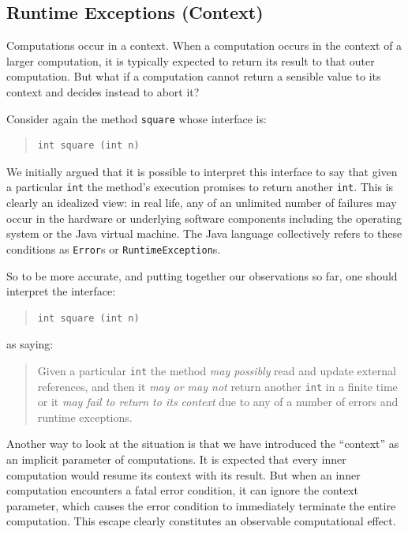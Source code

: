 \documentclass{article}
\theoremstyle{remark}
\begin{document}
\subsection*{Runtime Exceptions (Context)}

Computations occur in a context. When a computation occurs in the context of
a larger computation, it is typically expected to return its result to that
outer computation. But what if a computation cannot return a sensible value
to its context and decides instead to abort it?

Consider again the method \verb|square| whose interface is:
\begin{quote}
\begin{verbatim} 
int square (int n)
\end{verbatim}
\end{quote}
We initially argued that it is possible to interpret this interface to say
that given a particular \verb|int| the method's execution promises to return
another \verb|int|. This is clearly an idealized view: in real life, any of
an unlimited number of failures may occur in the hardware or underlying
software components including the operating system or the Java virtual
machine. The Java language collectively refers to these conditions as
\verb|Error|s or \verb|RuntimeException|s.

So to be more accurate, and putting together our observations so far, one
should interpret the interface:
\begin{quote}
\begin{verbatim} 
int square (int n)
\end{verbatim}
\end{quote}
as saying:
\begin{quote}
Given a particular \verb|int| the method \emph{may possibly} read and
update external references, and then it \emph{may or may not} return another
\verb|int| in a finite time or it \emph{may fail to return to its context}
due to any of a number of errors and runtime exceptions.
\end{quote}

Another way to look at the situation is that we have introduced the
``context'' as an implicit parameter of computations. It is expected that
every inner computation would resume its context with its result. But when an
inner computation encounters a fatal error condition, it can ignore the
context parameter, which causes the error condition to immediately terminate
the entire computation. This escape clearly constitutes an observable
computational effect.
\end{document}
